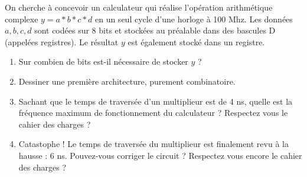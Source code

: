 \documentclass[a4paper,11pt]{article}
\begin{document}
On cherche à concevoir un calculateur qui réalise l'opération arithmétique complexe $y=a*b*c*d$ en un seul cycle d'une horloge à 100 Mhz. Les données $a,b,c,d$ sont codées sur 8 bits et stockées
au préalable dans des bascules D (appelées registres). Le résultat $y$ est également stocké dans un registre.

\begin{enumerate}
  \item Sur combien de bits est-il nécessaire de stocker $y$ ?
  \item Dessiner une première architecture, purement combinatoire.
  \item Sachant que le temps de traversée d'un multiplieur est de 4 ns, quelle est la fréquence maximum de fonctionnement du calculateur ? Respectez vous le cahier des charges ?
  \item Catastophe ! Le temps de traversée du multiplieur est finalement revu à la hausse : 6 ns. Pouvez-vous corriger le circuit ? Respectez vous encore le cahier des charges ?
\end{enumerate}
\end{document}
